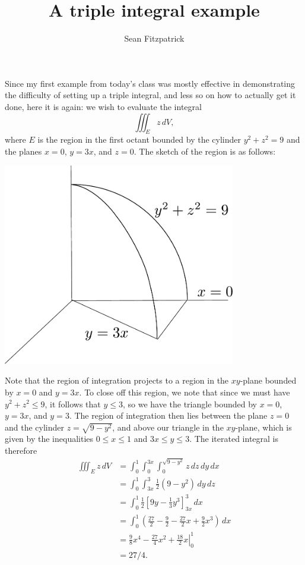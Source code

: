 \documentclass[letterpaper,12pt]{article}
\title{A triple integral example}
\author{Sean Fitzpatrick}
\begin{document}
\maketitle

Since my first example from today's class was mostly effective in demonstrating the difficulty of setting up a triple integral, and less so on how to actually get it done, here it is again: we wish to evaluate the integral 
\[
\iiint_E z\,dV,
\]
where $E$ is the region in the first octant bounded by the cylinder $y^2+z^2=9$ and the planes $x=0$, $y=3x$, and $z=0$. The sketch of the region is as follows:
\begin{center}
\includegraphics[width=4in]{triple_eg.pdf}
\end{center}
Note that the region of integration projects to a region in the $xy$-plane bounded by $x=0$ and $y=3x$. To close off this region, we note that since we must have $y^2+z^2\leq 9$, it follows that $y\leq 3$, so we have the triangle bounded by $x=0$, $y=3x$, and $y=3$. The region of integration then lies between the plane $z=0$ and the cylinder $z=\sqrt{9-y^2}$, and above our triangle in the $xy$-plane, which is given by the inequalities $0\leq x\leq 1$ and $3x\leq y\leq 3$. The iterated integral is therefore
\begin{align*}
\iiint_E z\,dV &= \int_0^1\int_0^{3x}\int_0^{\sqrt{9-y^2}}z\,dz\,dy\,dx\\
& = \int_0^1\int_{3x}^3\frac{1}{2}(9-y^2)\,dy\,dz\\
& = \int_0^1\frac{1}{2}\left[9y-\frac{1}{3}y^3\right]_{3x}^3\,dx\\
& = \int_0^1\left(\frac{27}{2}-\frac{9}{2}-\frac{27}{2}x+\frac{9}{2}x^3\right)\,dx\\
& = \left.\frac{9}{8}x^4-\frac{27}{4}x^2+\frac{18}{2}x\right|_0^1\\
& = 27/4.
\end{align*}
\end{document}
